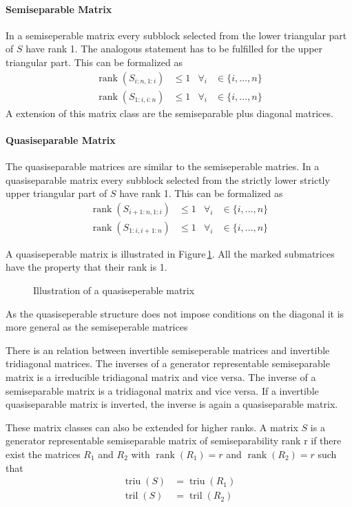 \documentclass[doctype=mastersthesis,BCOR=15mm,biblatex]{ldvbook}%
\DeclareMathOperator{\rank}{rank}
\DeclareMathOperator{\triu}{triu}
\DeclareMathOperator{\tril}{tril}
\begin{document}
\paragraph{Semiseparable Matrix}
In a semiseperable matrix every subblock selected from the lower triangular part of $S$ have rank 1. The analogous statement has to be fulfilled for the upper triangular part.
This can be formalized as 
\begin{align}
	\rank(S_{i:n,1:i}) &\leq 1 & \forall_i &\in\{i,\dots,n\}\\
	\rank(S_{1:i,i:n}) &\leq 1 & \forall_i &\in\{i,\dots,n\}
\end{align}
A extension of this matrix class are the semiseparable plus diagonal matrices.

\paragraph{Quasiseparable Matrix}
The quasiseparable matrices are similar to the semiseperable matries. In a quasiseparable matrix every subblock selected from the strictly lower strictly upper triangular part of $S$ have rank 1. 
This can be formalized as 
\begin{align}
\rank(S_{i+1:n,1:i}) &\leq 1 & \forall_i &\in\{i,\dots,n\}\\
\rank(S_{1:i,i+1:n}) &\leq 1 & \forall_i &\in\{i,\dots,n\}
\end{align}

A quasiseperable matrix is illustrated in Figure\,\ref{fig:quasiseperable}. All the marked submatrices have the property that their rank is 1.
\begin{figure}
	\centering
	
	\caption{Illustration of a quasiseperable matrix}
	\label{fig:quasiseperable}
\end{figure}
As the quasiseperable structure does not impose conditions on the diagonal it is more general as the semiseperable matrices 

There is an relation between invertible semiseperable matrices and invertible tridiagonal matrices.
The inverses of a generator representable semiseparable matrix is a irreducible tridiagonal matrix and vice versa. 
The inverse of a semiseparable matrix is a tridiagonal matrix and vice versa.
If a invertible quasiseparable matrix is inverted, the inverse is again a quasiseparable matrix.

These matrix classes can also be extended for higher ranks.
A matrix $S$ is a generator representable semiseparable matrix of semiseparability rank r if there exist the matrices $R_1$ and $R_2$ with $\rank(R_1)=r$ and $\rank(R_2)=r$ such that
\begin{align}
\triu(S) &= \triu(R_1)\\
\tril(S) &= \tril(R_2)
\end{align}
\end{document}
